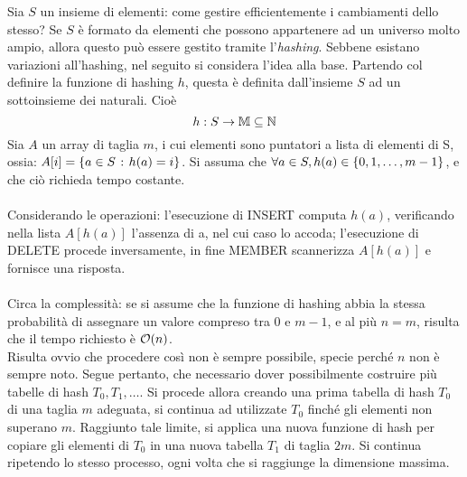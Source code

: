 \documentclass{subfiles}
\begin{document}
Sia \(S\) un insieme di elementi: come gestire efficientemente i cambiamenti dello stesso?
Se \(S\) è formato da elementi che possono appartenere ad un universo molto ampio, allora questo può essere gestito tramite l'\emph{hashing}.
Sebbene esistano variazioni all'hashing, nel seguito si considera l'idea alla base.
Partendo col definire la funzione di hashing \(h\), questa è definita dall'insieme \(S\) ad un sottoinsieme dei naturali. Cioè
\[
    h : S \to \mathbb{M} \subseteq \mathbb{N}
\]
Sia \(A\) un array di taglia \(m\), i cui elementi sono puntatori a lista di elementi di S, ossia: \(A[i] = \left\{a \in S \operatorname{\: {:} \:} h(a) = i\right\}\).
Si assuma che \(\forall a \in S, h(a) \in \left\{0, 1, \ldots, m - 1\right\}\), e che ciò richieda tempo costante.
\\ \\
Considerando le operazioni: l'esecuzione di INSERT computa \(h(a)\), verificando nella lista \(A[h(a)]\) l'assenza di a, nel cui caso lo accoda;
l'esecuzione di DELETE procede inversamente, in fine MEMBER scannerizza \(A[h(a)]\) e fornisce una risposta.
\\ \\
Circa la complessità: se si assume che la funzione di hashing abbia la stessa probabilità di assegnare un valore compreso tra \(0\) e \(m - 1\),
e al più \(n = m\), risulta che il tempo richiesto è \(\order{n}\).
\\
Risulta ovvio che procedere così non è sempre possibile, specie perché \(n\) non è sempre noto.
Segue pertanto, che necessario dover possibilmente costruire più tabelle di hash \(T_{0}, T_{1}, \ldots\).
Si procede allora creando una prima tabella di hash \(T_{0}\) di una taglia \(m\) adeguata, si continua ad utilizzate \(T_{0}\) finché gli elementi non superano \(m\).
Raggiunto tale limite, si applica una nuova funzione di hash per copiare gli elementi di \(T_{0}\) in una nuova tabella \(T_{1}\) di taglia \(2m\).
Si continua ripetendo lo stesso processo, ogni volta che si raggiunge la dimensione massima.
\end{document}
